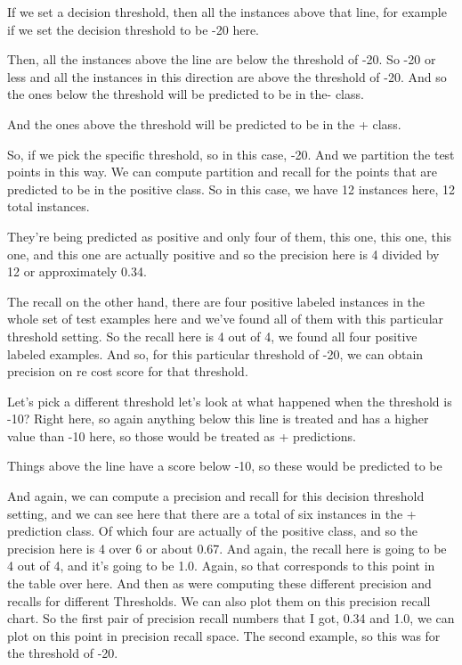 \begin{multicols}{2}
If we set a decision threshold, then all the instances above that line, for example if we set the decision threshold to be -20 here. 

Then, all the instances above the line are below the threshold of -20. So -20 or less and all the instances in this direction are above the threshold of -20. And so the ones below the threshold will be predicted to be in the- class. 

And the ones above the threshold will be predicted to be in the + class. 

So, if we pick the specific threshold, so in this case, -20. And we partition the test points in this way. We can compute partition and recall for the points that are predicted to be in the positive class. So in this case, we have 12 instances here, 12 total instances. 

They're being predicted as positive and only four of them, this one, this one, this one, and this one are actually positive and so the precision here is 4 divided by 12 or approximately 0.34. 

The recall on the other hand, there are four positive labeled instances in the whole set of test examples here and we've found all of them with this particular threshold setting. So the recall here is 4 out of 4, we found all four positive labeled examples. And so, for this particular threshold of -20, we can obtain precision on re cost score for that threshold. 

Let's pick a different threshold let's look at what happened when the threshold is -10? Right here, so again anything below this line is treated and has a higher value than -10 here, so those would be treated as + predictions. 

Things above the line have a score below -10, so these would be predicted to be 

And again, we can compute a precision and recall for this decision threshold setting, and we can see here that there are a total of six instances in the + prediction class. Of which four are actually of the positive class, and so the precision here is 4 over 6 or about 0.67. And again, the recall here is going to be 4 out of 4, and it's going to be 1.0. Again, so that corresponds to this point in the table over here. And then as were computing these different precision and recalls for different Thresholds. We can also plot them on this precision recall chart. So the first pair of precision recall numbers that I got, 0.34 and 1.0, we can plot on this point in precision recall space. The second example, so this was for the threshold of -20. 


\end{multicols}
